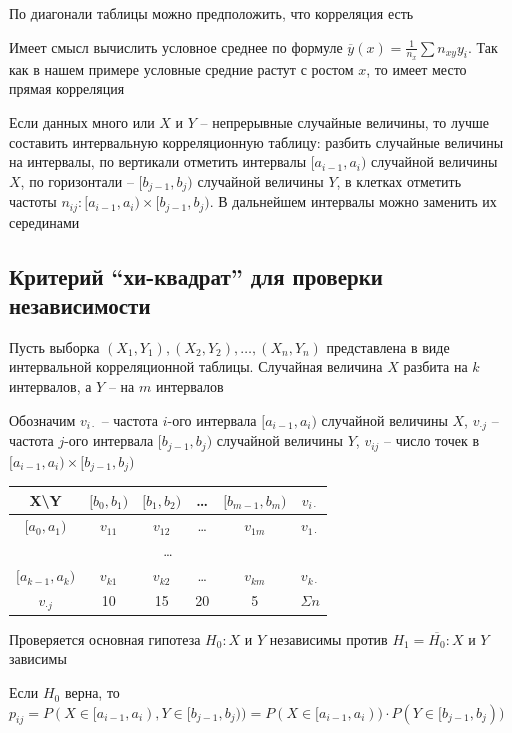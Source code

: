 \documentclass[12pt]{article}
\begin{document}
\smallvspace

По диагонали таблицы можно предположить, что корреляция есть

Имеет смысл вычислить условное среднее по формуле $\overline y (x) = \frac{1}{n_x} \sum n_{xy} y_i$. Так как в нашем примере
условные средние растут с ростом $x$, то имеет место прямая корреляция

\Nota Если данных много или $X$ и $Y$ -- непрерывные случайные величины, то лучше составить интервальную корреляционную таблицу:
разбить случайные величины на интервалы, по вертикали отметить интервалы $[a_{i - 1}, a_i)$ случайной величины $X$, 
по горизонтали -- $[b_{j - 1}, b_j)$ случайной величины $Y$, в клетках 
отметить частоты $n_{ij} : [a_{i - 1}, a_i) \times [b_{j - 1}, b_j)$. В дальнейшем интервалы можно заменить их серединами

\subsection{Критерий \enquote{хи-квадрат} для проверки независимости}

Пусть выборка $(X_1, Y_1), (X_2, Y_2), \dots, (X_n, Y_n)$ представлена в виде интервальной корреляционной таблицы. Случайная величина $X$ 
разбита на $k$ интервалов, а $Y$ -- на $m$ интервалов

Обозначим $v_{i\cdot}$ -- частота $i$-ого интервала $[a_{i - 1}, a_i)$ случайной величины $X$, 
$v_{\cdot j}$ -- частота $j$-ого интервала $[b_{j - 1}, b_j)$ случайной величины $Y$, $v_{ij}$ -- число точек в $[a_{i - 1}, a_i) \times [b_{j - 1}, b_j)$


\begin{tabular}{c|c|c|c|c|c}
    X\backslash Y & $[b_0, b_1)$ & $[b_1, b_2)$ & \dots & $[b_{m - 1}, b_m)$ & $v_{i\cdot}$ \\
    \hline
    $[a_0, a_1)$ & $v_{11}$ & $v_{12}$ & \dots & $v_{1m}$ & $v_{1\cdot}$ \\
    \hline
    \multicolumn{6}{c}{\dots} \\
    \hline
    $[a_{k - 1}, a_k)$ & $v_{k1}$ & $v_{k2}$ & \dots & $v_{km}$ & $v_{k\cdot}$ \\
    \hline
    $v_{\cdot j}$ & 10 & 15 & 20 & 5 & $\Sigma n$ \\
\end{tabular}

Проверяется основная гипотеза $H_0 : X \text{ и } Y$ независимы против $H_1 = \overline{H_0} : X \text{ и } Y$ зависимы

Если $H_0$ верна, то $p_{ij} = P(X \in [a_{i - 1}, a_i), Y \in [b_{j - 1}, b_j)) = P(X \in [a_{i - 1}, a_i)) \cdot P(Y \in [b_{j - 1}, b_j))$
\end{document}
